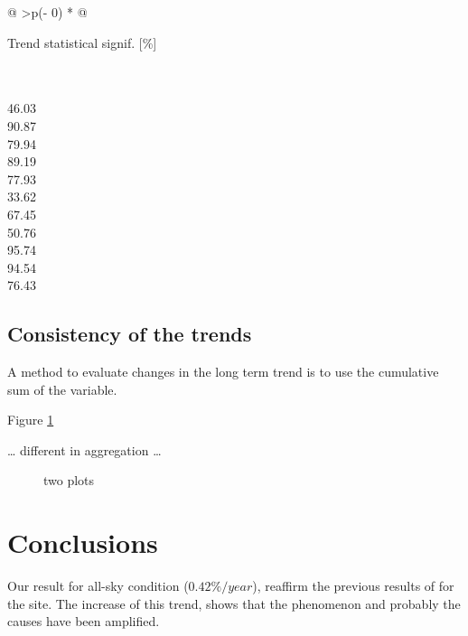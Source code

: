 \documentclass[preprint, 3p,
authoryear]{elsarticle} %
\begin{document}
\begin{longtable}[]{@{}
  >{\centering\arraybackslash}p{(\columnwidth - 0\tabcolsep) * }@{}}
\toprule\noalign{}
\begin{minipage}[b]{\linewidth}\centering
Trend statistical signif. {[}\%{]}
\end{minipage} \\
\midrule\noalign{}
\endhead
\bottomrule\noalign{}
 \\
46.03 \\
90.87 \\
79.94 \\
89.19 \\
77.93 \\
33.62 \\
67.45 \\
50.76 \\
95.74 \\
94.54 \\
76.43 \\
\end{longtable}

\hypertarget{consistency-of-the-trends}{%
\subsection{Consistency of the trends}\label{consistency-of-the-trends}}

A method to evaluate changes in the long term trend is to use the
cumulative sum of the variable.

Figure \ref{fig:cumsum}

\ldots{} different in aggregation \ldots{}

\begin{figure}[h!]

{\centering {}

}

\caption{two plots}\label{fig:cumsum}
\end{figure}

\hypertarget{conclusions}{%
\section{Conclusions}\label{conclusions}}

Our result for all-sky condition (\(0.42\%/year\)), reaffirm the
previous results of \citet{Bais2013} for the site. The increase of this
trend, shows that the phenomenon and probably the causes have been
amplified.
\end{document}
